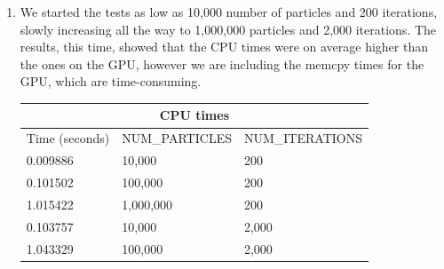 \documentclass[english]{exam}
\begin{document}
\begin{enumerate}
\item We started the tests as low as 10,000 number of particles and 200 iterations, slowly increasing all the way to 1,000,000 particles and 2,000 iterations. The results, this time, showed that the CPU times were on average higher than the ones on the GPU, however we are including the memcpy times for the GPU, which are time-consuming.\\
  \begin{tabular}{ |p{4cm}||p{4cm}|p{4cm}|  }
    \hline
    \multicolumn{3}{|c|}{CPU times} \\
    \hline
    Time (seconds)& NUM\_PARTICLES& NUM\_ITERATIONS\\
    \hline
    0.009886     & 10,000    &200\\
    0.101502&   100,000  & 200\\
    1.015422& 1,000,000 & 200\\
    0.103757 & 10,000 & 2,000\\
    1.043329&   100,000  & 2,000\\
    \hline
  \end{tabular}
  

\end{enumerate}
\end{document}
